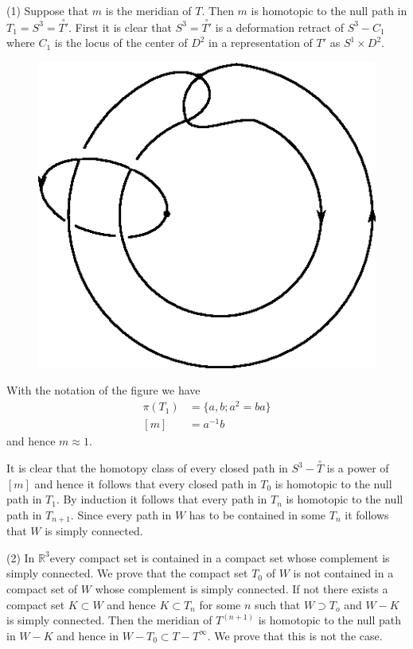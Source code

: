 (1) Suppose that $m$ is the meridian of $T$. Then $m$ is homotopic to
the null path in $T_1 = S^3 = \overset{\circ}{T'}$. First it is clear that
$S^3 = \overset{\circ}{T'}$ is a deformation retract of $S^3 - C_1$ where
$C_1$ is the locus of the center of $D^2$ in a representation of $T'$
as $S^1 \times D^2$. 
\begin{figure}[H]
\centering
\includegraphics{vol44-fig/fig44-13.eps}
\end{figure}

With the notation of the figure we have  
\begin{align*}
\pi (T_1) &= \{ a,b; a^2 = ba \} \\
[m] & = a^{-1} b
\end{align*}
and hence $m \approx 1$. 

It is clear that the homotopy class of every
closed path in $S^3 - \overset{\circ}{T}$ is a power of $[m]$ and hence it
follows that every closed path in $T_0$ is homotopic to the null path
in $T_1$. By induction it follows that every path in $T_n$ is
homotopic to the null path in $T_{n+1}$. Since every path in $W$ has to
be contained in some $T_n$ it follows that $W$ is simply connected. 

(2) In $\mathbb{R}^3$\pageoriginale every compact set is contained in a
compact set whose complement is simply connected. We prove that the
compact set $T_0$ of $W$ is not contained in a compact set of $W$
whose complement is simply connected. If not there exists a compact
set $K \subset W$ 
and hence $K \subset T_n$ for some $n$ such that $W \supset T_o$ and
$W - K$ is simply connected. Then the meridian of $T^{(n+1)}$ is
homotopic to the null path in $W - K$ and hence in $W- T_0 \subset T -
T^{\infty}$. We prove that this is not the case. 

